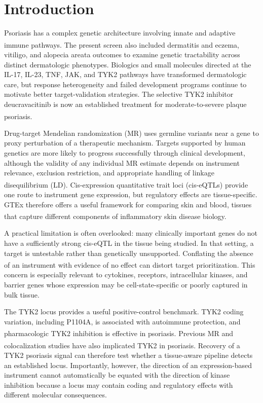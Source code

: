 \section*{Introduction}

Psoriasis has a complex genetic architecture involving innate and adaptive immune pathways.\textsuperscript{\cite{tsoi2012psoriasis}} The present screen also included dermatitis and eczema, vitiligo, and alopecia areata outcomes to examine genetic tractability across distinct dermatologic phenotypes. Biologics and small molecules directed at the IL-17, IL-23, TNF, JAK, and TYK2 pathways have transformed dermatologic care, but response heterogeneity and failed development programs continue to motivate better target-validation strategies. The selective TYK2 inhibitor deucravacitinib is now an established treatment for moderate-to-severe plaque psoriasis.\textsuperscript{\cite{armstrong2023deucravacitinib}}

Drug-target Mendelian randomization (MR) uses germline variants near a gene to proxy perturbation of a therapeutic mechanism. Targets supported by human genetics are more likely to progress successfully through clinical development, although the validity of any individual MR estimate depends on instrument relevance, exclusion restriction, and appropriate handling of linkage disequilibrium (LD).\textsuperscript{\cite{nelson2015genetic,king2019drugtargets,schmidt2020drugtarget,burgess2023drugdiscovery}} Cis-expression quantitative trait loci (cis-eQTLs) provide one route to instrument gene expression, but regulatory effects are tissue-specific. GTEx therefore offers a useful framework for comparing skin and blood, tissues that capture different components of inflammatory skin disease biology.\textsuperscript{\cite{gtex2020,ongen2017causaltissues}}

A practical limitation is often overlooked: many clinically important genes do not have a sufficiently strong cis-eQTL in the tissue being studied. In that setting, a target is untestable rather than genetically unsupported. Conflating the absence of an instrument with evidence of no effect can distort target prioritization.\textsuperscript{\cite{gill2024pitfalls,sanderson2022mr}} This concern is especially relevant to cytokines, receptors, intracellular kinases, and barrier genes whose expression may be cell-state-specific or poorly captured in bulk tissue.

The TYK2 locus provides a useful positive-control benchmark. TYK2 coding variation, including P1104A, is associated with autoimmune protection, and pharmacologic TYK2 inhibition is effective in psoriasis.\textsuperscript{\cite{steri2025tyk2,armstrong2023deucravacitinib}} Previous MR and colocalization studies have also implicated TYK2 in psoriasis.\textsuperscript{\cite{guo2024tyk2,yuan2023tyk2}} Recovery of a TYK2 psoriasis signal can therefore test whether a tissue-aware pipeline detects an established locus. Importantly, however, the direction of an expression-based instrument cannot automatically be equated with the direction of kinase inhibition because a locus may contain coding and regulatory effects with different molecular consequences.

